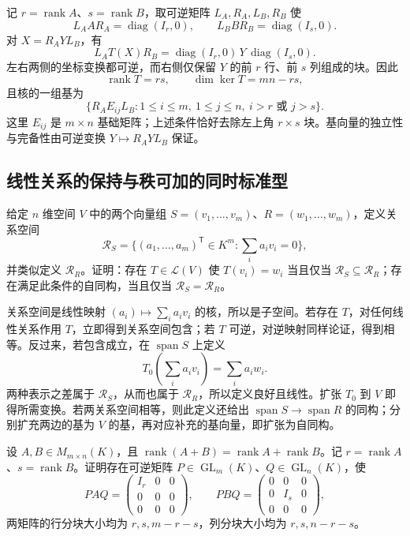 \begin{solve}
记 $r=\operatorname{rank}A$、$s=\operatorname{rank}B$，取可逆矩阵 $L_A,R_A,L_B,R_B$ 使
\[
    L_AAR_A=\operatorname{diag}(I_r,0),\qquad
    L_BBR_B=\operatorname{diag}(I_s,0).
\]
对 $X=R_AYL_B$，有
\[
    L_AT(X)R_B=
    \operatorname{diag}(I_r,0)\,Y\,\operatorname{diag}(I_s,0).
\]
左右两侧的坐标变换都可逆，而右侧仅保留 $Y$ 的前 $r$ 行、前 $s$ 列组成的块。因此
\[
    \operatorname{rank}T=rs,\qquad \dim\ker T=mn-rs,
\]
且核的一组基为
\[
    \{R_AE_{ij}L_B:1\leq i\leq m,\ 1\leq j\leq n,
    \ i>r\text{ 或 }j>s\}.
\]
这里 $E_{ij}$ 是 $m\times n$ 基础矩阵；上述条件恰好去除左上角 $r\times s$ 块。基向量的独立性与完备性由可逆变换 $Y\mapsto R_AYL_B$ 保证。
\end{solve}

\subsection{线性关系的保持与秩可加的同时标准型}

\begin{example}
\label{ex:xie-ex-relations-preservation}
给定 $n$ 维空间 $V$ 中的两个向量组 $S=(v_1,\ldots,v_m)$、$R=(w_1,\ldots,w_m)$，定义关系空间
\[
    \mathcal R_S=\{(a_1,\ldots,a_m)^{\mathsf T}\in K^m:
    \textstyle\sum_i a_iv_i=0\},
\]
并类似定义 $\mathcal R_R$。证明：存在 $T\in\mathcal L(V)$ 使 $T(v_i)=w_i$ 当且仅当 $\mathcal R_S\subseteq\mathcal R_R$；存在满足此条件的自同构，当且仅当 $\mathcal R_S=\mathcal R_R$。
\end{example}

\begin{solve}
关系空间是线性映射 $(a_i)\mapsto\sum_i a_iv_i$ 的核，所以是子空间。若存在 $T$，对任何线性关系作用 $T$，立即得到关系空间包含；若 $T$ 可逆，对逆映射同样论证，得到相等。反过来，若包含成立，在 $\operatorname{span}S$ 上定义
\[
    T_0\left(\sum_i a_iv_i\right)=\sum_i a_iw_i.
\]
两种表示之差属于 $\mathcal R_S$，从而也属于 $\mathcal R_R$，所以定义良好且线性。扩张 $T_0$ 到 $V$ 即得所需变换。若两关系空间相等，则此定义还给出 $\operatorname{span}S\to\operatorname{span}R$ 的同构；分别扩充两边的基为 $V$ 的基，再对应补充的基向量，即扩张为自同构。
\end{solve}

\begin{example}
\label{ex:xie-ex-additive-rank-normal-form}
设 $A,B\in M_{m\times n}(K)$，且 $\operatorname{rank}(A+B)=\operatorname{rank}A+\operatorname{rank}B$。记 $r=\operatorname{rank}A$、$s=\operatorname{rank}B$。证明存在可逆矩阵 $P\in\operatorname{GL}_m(K)$、$Q\in\operatorname{GL}_n(K)$，使
\[
    PAQ=\begin{pmatrix}I_r&0&0\\0&0&0\\0&0&0\end{pmatrix},
    \qquad
    PBQ=\begin{pmatrix}0&0&0\\0&I_s&0\\0&0&0\end{pmatrix},
\]
两矩阵的行分块大小均为 $r,s,m-r-s$，列分块大小均为 $r,s,n-r-s$。
\end{example}

